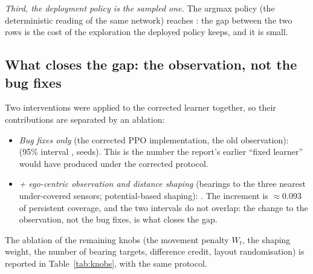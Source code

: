 \emph{Third, the deployment policy is the sampled one.}  The argmax policy
(the deterministic reading of the same network) reaches \tokEgoShapeDetCK{}:
the gap between the two rows is the cost of the exploration the deployed
policy keeps, and it is small.

\subsection{What closes the gap: the observation, not the bug fixes}
\label{sec:results_abl}

Two interventions were applied to the corrected learner together, so their
contributions are separated by an ablation:

\begin{itemize}
  \item \emph{Bug fixes only} (the corrected PPO implementation, the old
        observation): \tokBugFixCK{} (95\% interval \tokBugFixCi,
        \tokBugFixN{} seeds).  This is the number the report's earlier
        ``fixed learner'' would have produced under the corrected protocol.
  \item \emph{+ ego-centric observation and distance shaping} (bearings to
        the three nearest under-covered sensors; potential-based shaping):
        \tokEgoShapeCK.  The increment is $\approx 0.093$ of persistent
        coverage, and the two intervals do not overlap: the change to the
        observation, not the bug fixes, is what closes the gap.
\end{itemize}

The ablation of the remaining knobs (the movement penalty $W_t$, the shaping
weight, the number of bearing targets, difference credit, layout
randomisation) is reported in Table~\ref{tab:knobs}, with the same protocol.

